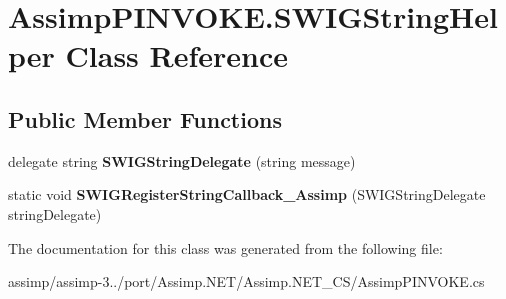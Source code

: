 \hypertarget{class_assimp_p_i_n_v_o_k_e_1_1_s_w_i_g_string_helper}{\section{Assimp\+P\+I\+N\+V\+O\+K\+E.\+S\+W\+I\+G\+String\+Helper Class Reference}
\label{class_assimp_p_i_n_v_o_k_e_1_1_s_w_i_g_string_helper}
}
\subsection*{Public Member Functions}
\begin{DoxyCompactItemize}
\item 
\hypertarget{class_assimp_p_i_n_v_o_k_e_1_1_s_w_i_g_string_helper_a48060964ebab63b451a0acb36c7102d9}{delegate string {\bfseries S\+W\+I\+G\+String\+Delegate} (string message)}\label{class_assimp_p_i_n_v_o_k_e_1_1_s_w_i_g_string_helper_a48060964ebab63b451a0acb36c7102d9}

\item 
\hypertarget{class_assimp_p_i_n_v_o_k_e_1_1_s_w_i_g_string_helper_a15a5d7b5ef52da1828a08e8f98443c0b}{static void {\bfseries S\+W\+I\+G\+Register\+String\+Callback\+\_\+\+Assimp} (S\+W\+I\+G\+String\+Delegate string\+Delegate)}\label{class_assimp_p_i_n_v_o_k_e_1_1_s_w_i_g_string_helper_a15a5d7b5ef52da1828a08e8f98443c0b}

\end{DoxyCompactItemize}


The documentation for this class was generated from the following file\+:\begin{DoxyCompactItemize}
\item 
assimp/assimp-\/3../port/\+Assimp.\+N\+E\+T/\+Assimp.\+N\+E\+T\+\_\+\+C\+S/Assimp\+P\+I\+N\+V\+O\+K\+E.\+cs\end{DoxyCompactItemize}
